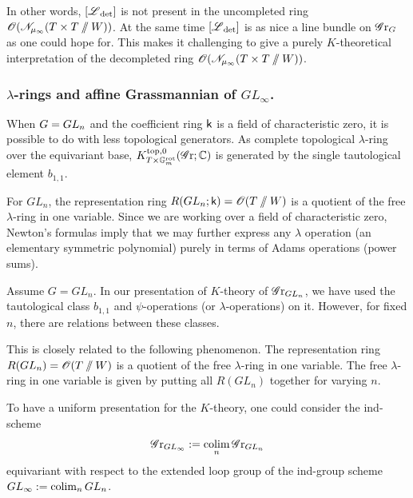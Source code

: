 In other words, $[\operatorname{\mathscr{L}}_{\det}]$ is not present in the uncompleted ring $\operatorname{\mathscr{O}}(\mathscr{N}_{\mu_{\infty}}(T \times T \sslash W))$. At the same time $[\operatorname{\mathscr{L}}_{\det}]$ is as nice a line bundle on $\operatorname{\mathscr{G}r}_G$ as one could hope for. This makes it challenging to give a purely $K$-theoretical interpretation of the decompleted ring $\operatorname{\mathscr{O}}(\mathscr{N}_{\mu_{\infty}}(T \times T \sslash W))$.


\subsubsection{\texorpdfstring{$\lambda$}{Lambda}-rings and affine Grassmannian of \texorpdfstring{$GL_{\infty}$}{GL infinity}.}


\begin{remark}
When $G=GL_n$ and the coefficient ring $\mathsf{k}$ is a field of characteristic zero, it is possible to do with less topological generators. As complete topological $\lambda$-ring over the equivariant base, $K^{\mathrm{top}, 0}_{T \times \mathbb{G}_m^{\mathrm{rot}}}(\operatorname{\mathscr{G}r}; \operatorname{\mathbb{C}})$ is generated by the single tautological element $b_{1,1}$.

For $GL_n$, the representation ring $R(GL_n; \mathsf{k}) = \operatorname{\mathscr{O}}(T \sslash W)$ is a quotient of the free $\lambda$-ring in one variable. Since we are working over a field of characteristic zero, Newton's formulas imply that we may further express any $\lambda$ operation (an elementary symmetric polynomial) purely in terms of Adams operations (power sums).
\end{remark}


\begin{remark}
Assume $G = GL_n$. In our presentation of $K$-theory of $\operatorname{\mathscr{G}r}_{GL_n}$, we have used the tautological class $b_{1,1}$ and $\psi$-operations (or $\lambda$-operations) on it. However, for fixed $n$, there are relations between these classes. 

This is closely related to the following phenomenon. The representation ring $R(GL_n) = \operatorname{\mathscr{O}}(T \sslash W)$ is a quotient of the free $\lambda$-ring in one variable. The free $\lambda$-ring in one variable is given by putting all $R(GL_n)$ together for varying $n$.    


To have a uniform presentation for the $K$-theory, one could consider the ind-scheme
\begin{equation*}
    \operatorname{\mathscr{G}r}_{GL_{\infty}} := \operatorname*{colim}_n \operatorname{\mathscr{G}r}_{GL_n}
\end{equation*}
equivariant with respect to the extended loop group of the ind-group scheme $GL_{\infty} := \operatorname*{colim}_n GL_n$.
\end{remark}